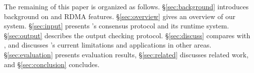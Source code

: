 

The remaining of this paper is organized as follows. 
\S\ref{sec:background} introduces background on \paxos and RDMA features. 
\S\ref{sec:overview} gives an overview of our \xxx system. \S\ref{sec:input} 
presents \xxx's consensus protocol and its runtime system. \S\ref{sec:output} 
describes the output checking protocol. \S\ref{sec:discuss} compares \dare with 
\xxx, and discusses \xxx's current limitations and applications in other areas. 
\S\ref{sec:evaluation} presents evaluation results, \S\ref{sec:related} 
discusses related work, and \S\ref{sec:conclusion} concludes.   